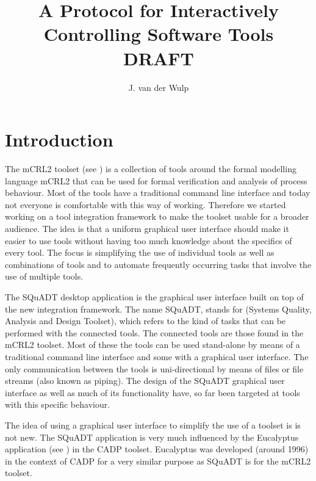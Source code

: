 \documentclass{article}
\title{A Protocol for Interactively Controlling Software Tools\\DRAFT}
\author{J. van der Wulp}
\newcommand{\squadt}{SQuADT\xspace}
\begin{document}
\maketitle
\thispagestyle{empty}

 \section{Introduction}

  The mCRL2 toolset (see \cite{groote_et_al:DSP:2007:862}) is a collection of
  tools around the formal modelling language mCRL2 that can be used for formal
  verification and analysis of process behaviour.  Most of the tools have a
  traditional command line interface and today not everyone is comfortable with
  this way of working.  Therefore we started working on a tool integration
  framework to make the toolset usable for a broader audience. The idea is that
  a uniform graphical user interface should make it easier to use tools without
  having too much knowledge about the specifics of every tool.  The focus is
  simplifying the use of individual tools as well as combinations of tools and
  to automate frequently occurring tasks that involve the use of multiple
  tools.
  
  The \squadt desktop application is the graphical user interface built on top
  of the new integration framework. The name \squadt, stands for (Systems
  Quality, Analysis and Design Toolset), which refers to the kind of tasks that
  can be performed with the connected tools. The connected tools are those
  found in the mCRL2 toolset. Most of these the tools can be used stand-alone
  by means of a traditional command line interface and some with a graphical
  user interface. The only communication between the tools is uni-directional
  by means of files or file streams (also known as piping). The design of the
  \squadt graphical user interface as well as much of its functionality have,
  so far been targeted at tools with this specific behaviour.
  
  The idea of using a graphical user interface to simplify the use of a toolset
  is is not new. The \squadt application is very much influenced by the
  Eucalyptus application (see \cite{CADP}) in the CADP toolset. Eucalyptus was
  developed (around 1996) in the context of CADP for a very similar purpose as
  \squadt is for the mCRL2 toolset.
  
  
\end{document}
